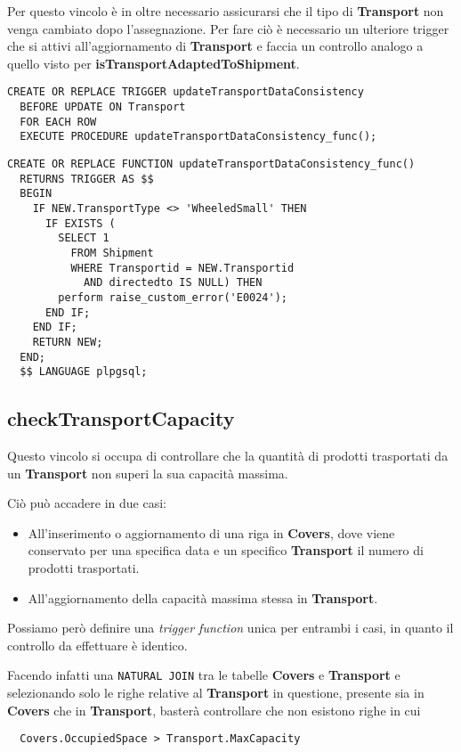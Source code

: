 Per questo vincolo è in oltre necessario assicurarsi che il tipo di \textbf{Transport} non venga cambiato dopo l'assegnazione. Per fare ciò è necessario un ulteriore trigger che si attivi all'aggiornamento di \textbf{Transport} e faccia un controllo analogo a quello visto per \textbf{isTransportAdaptedToShipment}.

\begin{lstlisting}[caption={Trigger per il vincolo \textbf{isTransportAdaptedToShipment}}]
  CREATE OR REPLACE TRIGGER updateTransportDataConsistency
  BEFORE UPDATE ON Transport
  FOR EACH ROW 
  EXECUTE PROCEDURE updateTransportDataConsistency_func();
\end{lstlisting}

\begin{lstlisting}[caption={Funzione \textbf{updateTransportDataConsistency\_func}}]
  CREATE OR REPLACE FUNCTION updateTransportDataConsistency_func()
  RETURNS TRIGGER AS $$
  BEGIN
    IF NEW.TransportType <> 'WheeledSmall' THEN
      IF EXISTS (
        SELECT 1
          FROM Shipment
          WHERE Transportid = NEW.Transportid
            AND directedto IS NULL) THEN
        perform raise_custom_error('E0024');
      END IF;
    END IF;
    RETURN NEW;
  END;
  $$ LANGUAGE plpgsql;
\end{lstlisting}

\subsection{\textbf{checkTransportCapacity}}

Questo vincolo si occupa di controllare che la quantità di prodotti trasportati da un \textbf{Transport} non superi la sua capacità massima. 

Ciò può accadere in due casi:
\begin{itemize}
  \item All'inserimento o aggiornamento di una riga in \textbf{Covers}, dove viene conservato per una specifica data e un specifico \textbf{Transport} il numero di prodotti trasportati.
  \item All'aggiornamento della capacità massima stessa in \textbf{Transport}.
\end{itemize}

Possiamo però definire una \textit{trigger function} unica per entrambi i casi, in quanto il controllo da effettuare è identico.

Facendo infatti una \lstinline{NATURAL JOIN} tra le tabelle \textbf{Covers} e \textbf{Transport} e selezionando solo le righe relative al \textbf{Transport} in questione, presente sia in \textbf{Covers} che in \textbf{Transport}, basterà controllare che non esistono righe in cui 
\begin{lstlisting}
  Covers.OccupiedSpace > Transport.MaxCapacity
\end{lstlisting}

